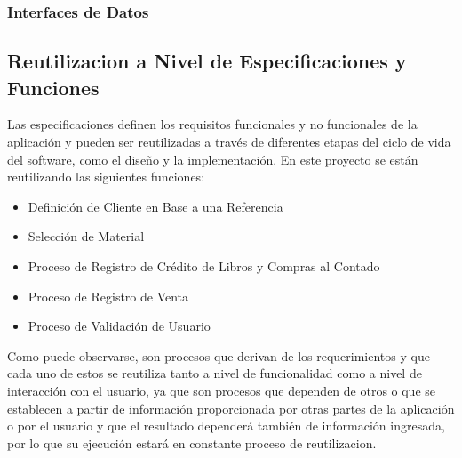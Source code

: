 \documentclass[runningheads]{llncs}
\begin{document}
\subsubsection*{Interfaces de Datos}
\subsection*{Reutilizacion a Nivel de Especificaciones y Funciones}
Las especificaciones definen los requisitos funcionales y no funcionales de la aplicación y pueden ser reutilizadas a través de diferentes etapas del ciclo de vida del software, como el diseño y la implementación.
En este proyecto se están reutilizando las siguientes funciones:
\begin{itemize}
    \item Definición de Cliente en Base a una Referencia
    \item Selección de Material
    \item Proceso de Registro de Crédito de Libros y Compras al Contado
    \item Proceso de Registro de Venta
    \item Proceso de Validación de Usuario
\end{itemize}
Como puede observarse, son procesos que derivan de los requerimientos y que cada uno de estos se reutiliza tanto a nivel de funcionalidad como a nivel de interacción con el usuario, ya que son procesos que dependen de otros o que se establecen a partir de información proporcionada por otras partes de la aplicación o por el usuario y que el resultado dependerá también de información ingresada, por lo que su ejecución estará en constante proceso de reutilizacion.
\end{document}
